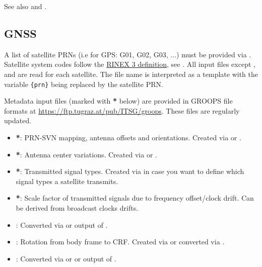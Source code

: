 See also  and .


\subsection{GNSS}\label{gnssTransmitterGeneratorType:gnss}
A list of satellite PRNs (i.e for GPS: G01, G02, G03, ...) must be provided via
. Satellite system codes follow the
\href{https://files.igs.org/pub/data/format/rinex305.pdf}{RINEX 3 definition}, see .
All input files except ,
and  are read for each satellite.
The file name is interpreted as a template with the variable \verb|{prn}| being replaced by the satellite PRN.

Metadata input files (marked with \textbf{*} below) are provided in GROOPS file formats at
\url{https://ftp.tugraz.at/pub/ITSG/groops}. These files are regularly updated.
\begin{itemize}
  \item {}\textbf{*}:
        PRN-SVN mapping, antenna offsets and orientations.
        Created via  or .
  \item {}\textbf{*}:
        Antenna center variations.
        Created via  or .
  \item {}\textbf{*}:
        Transmitted signal types.
        Created via  in case you want to define which signal
        types a satellite transmits.
  \item {}\textbf{*}:
        Scale factor of transmitted signals due to frequency offset/clock drift.
        Can be derived from broadcast clocks drifts.
  \item {}: Converted via  or
        output of .
  \item {}:
        Rotation from body frame to CRF. Created via  or converted via .
  \item {}:
        Converted via  or  or
        output of .
\end{itemize}


